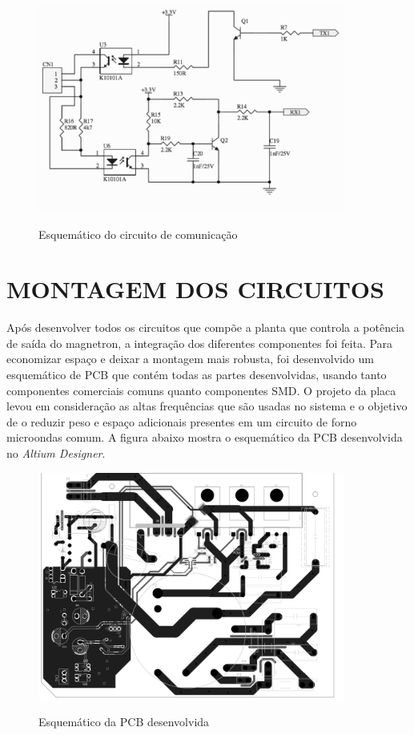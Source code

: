 \begin{figure}[H]
    \centering
    \caption{Esquemático do circuito de comunicação}
    \includegraphics[width=0.9\textwidth]{./dados/figuras/proj-comm}
    \label{fig:figura-comm}
\end{figure}



\section{MONTAGEM DOS CIRCUITOS}
\label{sec:montagem}
Após desenvolver todos os circuitos que compõe a planta que controla a potência de saída do magnetron, a integração dos diferentes componentes foi feita. Para economizar espaço e deixar a montagem mais robusta, foi desenvolvido um esquemático de PCB que contém todas as partes desenvolvidas, usando tanto componentes comerciais comuns quanto componentes SMD. O projeto da placa levou em consideração as altas frequências que são usadas no sistema e o objetivo de o reduzir peso e espaço adicionais presentes em um circuito de forno microondas comum. A figura abaixo mostra o esquemático da PCB desenvolvida no \textit{Altium Designer}.

\begin{figure}[H]
    \centering
    \caption{Esquemático da PCB desenvolvida}
    \includegraphics[width=0.9\textwidth]{./dados/figuras/proj-pcb}
    \label{fig:figura-montagem}
\end{figure}

